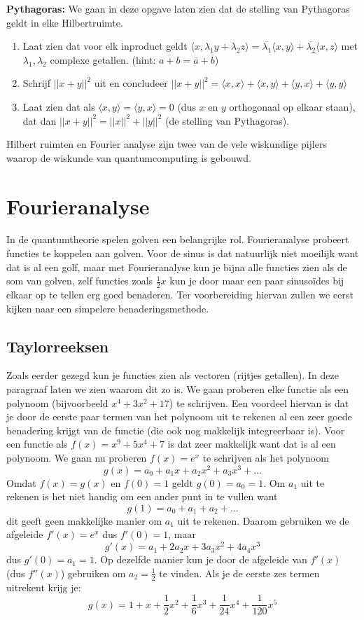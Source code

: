 \documentclass[../../main.tex]{subfiles}
\begin{document}
\begin{opdracht}
\textbf{Pythagoras:} We gaan in deze opgave laten zien dat de stelling van Pythagoras geldt in elke Hilbertruimte.
\begin{enumerate}
\item Laat zien dat voor elk inproduct geldt $\langle x,\lambda_1y+\lambda_2z\rangle=\overline{\lambda_1}\langle x,y\rangle+\overline{\lambda_2}\langle x,z\rangle$ met $\lambda_1,\lambda_2$ complexe getallen. (hint: $\overline{a+b}=\overline{a}+\overline{b}$)
\item Schrijf $||x+y||^2$ uit en concludeer $||x+y||^2=\langle x,x\rangle+\langle x,y\rangle + \langle y,x\rangle+\langle y,y\rangle$
\item Laat zien dat als $\langle x,y\rangle=\langle y,x\rangle =0$ (dus $x$ en $y$ orthogonaal op elkaar staan), dat dan  $||x+y||^2=||x||^2+||y||^2$ (de stelling van Pythagoras).
\end{enumerate}
\end{opdracht}
Hilbert ruimten en Fourier analyse zijn twee van de vele wiskundige pijlers waarop de wiskunde van quantumcomputing is gebouwd.

\section{Fourieranalyse}

In de quantumtheorie spelen golven een belangrijke rol. Fourieranalyse probeert functies te koppelen aan golven. Voor de sinus is dat natuurlijk niet moeilijk want dat is al een golf, maar met Fourieranalyse kun je bijna alle functies zien als de som van golven, zelf functies zoals $\frac{1}{2}x$ kun je door maar een paar sinuso\"ides bij elkaar op te tellen erg goed benaderen. Ter voorbereiding hiervan zullen we eerst kijken naar een simpelere benaderingsmethode.

\subsection*{Taylorreeksen}
Zoals eerder gezegd kun je functies zien als vectoren (rijtjes getallen). In deze paragraaf laten we zien waarom dit zo is. We gaan proberen elke functie als een polynoom (bijvoorbeeld $x^4+3x^2+17$) te schrijven. Een voordeel hiervan is dat je door de eerste paar termen van het polynoom uit te rekenen al een zeer goede benadering krijgt van de functie (die ook nog makkelijk integreerbaar is). Voor een functie als $f(x)=x^9+5x^4+7$ is dat zeer makkelijk want dat is al een polynoom. We gaan nu proberen $f(x)=e^x$ te schrijven als het polynoom $$g(x)=a_0+a_1x+a_2x^2+a_3x^3+\ldots$$ Omdat $f(x)=g(x)$ en $f(0)=1$ geldt $g(0)=a_0=1$. Om $a_1$ uit te rekenen is het niet handig om een ander punt in te vullen want $$g(1)=a_0+a_1+a_2+\ldots$$ dit geeft geen makkelijke manier om $a_1$ uit te rekenen. Daarom gebruiken we de afgeleide $f'(x)=e^x$ dus $f'(0)=1$, maar $$g'(x)=a_1+2a_2x+3a_3x^2+4a_4x^3$$
dus $g'(0)=a_1=1$. Op dezelfde manier kun je door de afgeleide van $f'(x)$ (dus $f''(x)$) gebruiken om $a_2=\frac{1}{2}$ te vinden. Als je de eerste zes termen uitrekent krijg je: $$g(x)=1+x+\frac{1}{2}x^2+\frac{1}{6}x^3+\frac{1}{24}x^4+\frac{1}{120}x^5$$
\end{document}
